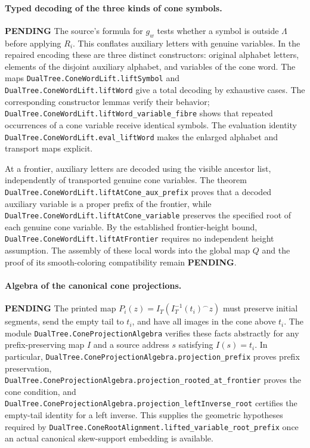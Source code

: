 \documentclass[11pt]{article}
\newcommand{\todo}{\textcolor{gray!70!black}{\textbf{PENDING}}}
\newcommand{\lean}[1]{\texttt{#1}}
\begin{document}
\paragraph{Typed decoding of the three kinds of cone symbols.} \todo
The source's formula for $g_w$ tests whether a symbol is outside
$\Lambda$ before applying $R_i$.  This conflates auxiliary letters
with genuine variables. In the repaired encoding these are three
distinct constructors: original alphabet letters, elements of the
disjoint auxiliary alphabet, and variables of the cone word.
The maps \lean{DualTree.ConeWordLift.liftSymbol} and
\lean{DualTree.ConeWordLift.liftWord}
give a total decoding by exhaustive cases.
The corresponding constructor lemmas verify their behavior;
\lean{DualTree.ConeWordLift.liftWord_variable_fibre} shows that
repeated occurrences of a cone variable receive identical symbols.
The evaluation identity
\lean{DualTree.ConeWordLift.eval_liftWord} makes the enlarged
alphabet and transport maps explicit.

At a frontier, auxiliary letters are decoded using the visible
ancestor list, independently of transported genuine cone variables.
The theorem
\lean{DualTree.ConeWordLift.liftAtCone_aux_prefix}
proves that a decoded auxiliary variable is a proper prefix of
the frontier, while
\lean{DualTree.ConeWordLift.liftAtCone_variable}
preserves the specified root of each genuine cone variable.
By the established frontier-height bound,
\lean{DualTree.ConeWordLift.liftAtFrontier}
requires no independent height assumption.
The assembly of these local words into the global map $Q$ and
the proof of its smooth-coloring compatibility remain \todo.

\paragraph{Algebra of the canonical cone projections.} \todo
The printed map $P_i(z)=I_T(I_T^{-1}(t_i)^\frown z)$
must preserve initial segments, send the empty tail to $t_i$,
and have all images in the cone above $t_i$.
The module \lean{DualTree.ConeProjectionAlgebra} verifies these
facts abstractly for any prefix-preserving map $I$ and a
source address $s$ satisfying $I(s)=t_i$.
In particular,
\lean{DualTree.ConeProjectionAlgebra.projection_prefix}
proves prefix preservation,
\lean{DualTree.ConeProjectionAlgebra.projection_rooted_at_frontier}
proves the cone condition, and
\lean{DualTree.ConeProjectionAlgebra.projection_leftInverse_root}
certifies the empty-tail identity for a left inverse.
This supplies the geometric hypotheses required by
\lean{DualTree.ConeRootAlignment.lifted_variable_root_prefix}
once an actual canonical skew-support embedding is available.
\end{document}
